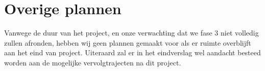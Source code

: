 \section{Overige plannen}
\label{overige}
Vanwege de duur van het project, en onze verwachting dat we fase 3 niet volledig zullen afronden, hebben wij geen plannen gemaakt voor als er ruimte overblijft aan het eind van project. Uiteraard zal er in het eindverslag wel aandacht besteed worden aan de mogelijke vervolgtrajecten na dit project.

